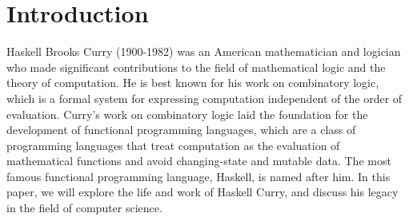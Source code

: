 \newpage
\section{Introduction}

Haskell Brooks Curry\cite{enwiki:1192145129} (1900-1982) was an American mathematician and logician who made significant contributions to the field of mathematical logic and the theory of computation. He is best known for his work on combinatory logic, which is a formal system for expressing computation independent of the order of evaluation. Curry's work on combinatory logic laid the foundation for the development of functional programming languages, which are a class of programming languages that treat computation as the evaluation of mathematical functions and avoid changing-state and mutable data. The most famous functional programming language, Haskell, is named after him. In this paper, we will explore the life and work of Haskell Curry, and discuss his legacy in the field of computer science.

